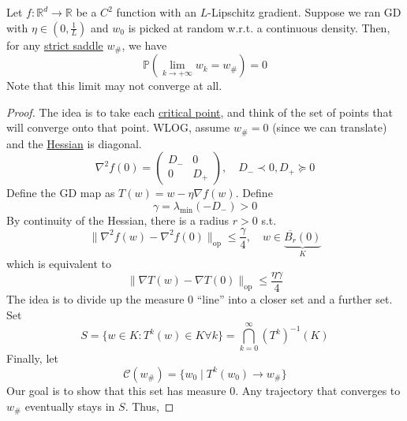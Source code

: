 	\begin{theorem}
	  \label{thm:escaping-strict-saddles}
		Let $f: \mathbb{R}^d \to \mathbb{R}$ be a $C^2$ function with an $L$-Lipschitz gradient. Suppose we ran GD with $\eta \in (0, \frac{1}{L})$ and $w_0$ is picked at random w.r.t. a continuous density. Then, for any \hyperref[def:strict-saddle]{strict saddle} $w_{\#}$, we have 
		\begin{equation}
			\mathbb{P}(\lim_{k \to +\infty} w_k = w_{\#}) = 0
		\end{equation}
		Note that this limit may not converge at all. 
	\end{theorem}
	\begin{proof}
		The idea is to take each \hyperref[real-def:critical-point]{critical point}, and think of the set of points that will converge onto that point. WLOG, assume $w_{\#} = 0$ (since we can translate) and the \hyperref[mv-def:hessian]{Hessian} is diagonal. 
		\begin{equation}
			\nabla^2 f(0) = \begin{pmatrix} 
				D_{-} & 0 \\ 0 & D_+ 
			\end{pmatrix}, \quad D_- \prec 0, D_+ \succeq 0
		\end{equation}
		Define the GD map as $T(w) = w - \eta \nabla f(w)$. Define 
		\begin{equation}
			\gamma = \lambda_{\min} (-D_-) > 0
		\end{equation}
		By continuity of the Hessian, there is a radius $r > 0$ s.t. 
		\begin{equation}
			\|\nabla^2 f(w) - \nabla^2 f(0)\|_{\mathrm{op}}  \leq \frac{\gamma}{4}, \quad w \in \underbrace{\overline{B_r}(0)}_{K}
		\end{equation}
		which is equivalent to 
		\begin{equation}
			\| \nabla T(w) - \nabla T(0) \|_{\mathrm{op}} \leq \frac{\eta \gamma}{4}
		\end{equation}
		The idea is to divide up the measure $0$ ``line'' into a closer set and a further set. Set
		\begin{equation}
			S = \{w \in K \colon T^k (w) \in K \forall k \} = \bigcap_{k=0}^\infty (T^k)^{-1} (K)
		\end{equation}
		Finally, let 
		\begin{equation}
			\mathcal{C}(w_{\#}) = \{w_0 \mid T^k (w_0) \to w_{\#} \}
		\end{equation}
		Our goal is to show that this set has measure $0$. Any trajectory that converges to $w_{\#}$ eventually stays in $S$. Thus, 

\end{proof}
